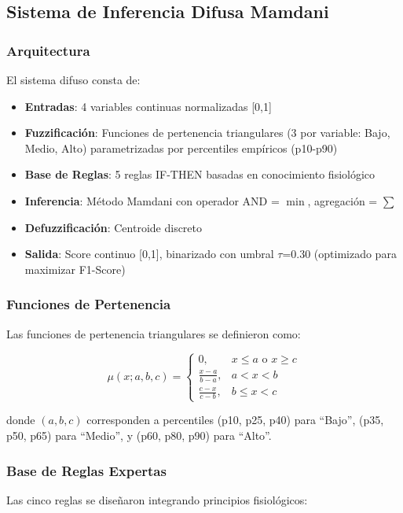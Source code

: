 \documentclass[journal,twoside,web]{ieeecolor}
\begin{document}
\subsection{Sistema de Inferencia Difusa Mamdani}

\subsubsection{Arquitectura}
El sistema difuso consta de:
\begin{itemize}
\item \textbf{Entradas}: 4 variables continuas normalizadas [0,1]
\item \textbf{Fuzzificación}: Funciones de pertenencia triangulares (3 por variable: Bajo, Medio, Alto) parametrizadas por percentiles empíricos (p10-p90)
\item \textbf{Base de Reglas}: 5 reglas IF-THEN basadas en conocimiento fisiológico
\item \textbf{Inferencia}: Método Mamdani con operador AND = $\min$, agregación = $\sum$
\item \textbf{Defuzzificación}: Centroide discreto
\item \textbf{Salida}: Score continuo [0,1], binarizado con umbral $\tau$=0.30 (optimizado para maximizar F1-Score)
\end{itemize}

\subsubsection{Funciones de Pertenencia}
Las funciones de pertenencia triangulares se definieron como:

\begin{equation}
\mu(x; a, b, c) = 
\begin{cases}
0, & x \leq a \text{ o } x \geq c \\
\frac{x-a}{b-a}, & a < x < b \\
\frac{c-x}{c-b}, & b \leq x < c
\end{cases}
\end{equation}

donde $(a, b, c)$ corresponden a percentiles (p10, p25, p40) para ``Bajo'', (p35, p50, p65) para ``Medio'', y (p60, p80, p90) para ``Alto''.

\subsubsection{Base de Reglas Expertas}
Las cinco reglas se diseñaron integrando principios fisiológicos:
\end{document}
